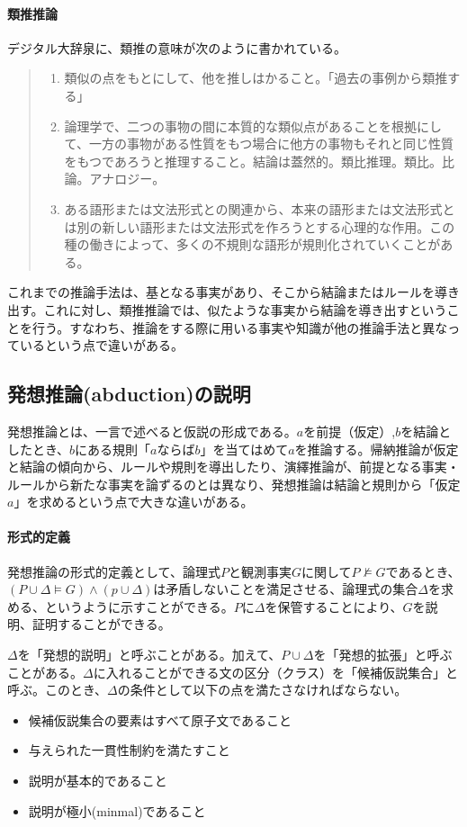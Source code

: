 \documentclass[dvipdfmx]{jsarticle}
\begin{document}
\paragraph{類推推論}デジタル大辞泉に、類推の意味が次のように書かれている。
\begin{quote}
  \begin{enumerate}
    \item 類似の点をもとにして、他を推しはかること。「過去の事例から類推する」
    \item 論理学で、二つの事物の間に本質的な類似点があることを根拠にして、一方の事物がある性質をもつ場合に他方の事物もそれと同じ性質をもつであろうと推理すること。結論は蓋然的。類比推理。類比。比論。アナロジー。
    \item ある語形または文法形式との関連から、本来の語形または文法形式とは別の新しい語形または文法形式を作ろうとする心理的な作用。この種の働きによって、多くの不規則な語形が規則化されていくことがある。
  \end{enumerate}
\end{quote}
これまでの推論手法は、基となる事実があり、そこから結論またはルールを導き出す。これに対し、類推推論では、似たような事実から結論を導き出すということを行う。すなわち、推論をする際に用いる事実や知識が他の推論手法と異なっているという点で違いがある。

\subsection{発想推論(abduction)の説明}
発想推論とは、一言で述べると仮説の形成である。$a$を前提（仮定）,$b$を結論としたとき、$b$にある規則「$aならばb$」を当てはめて$a$を推論する。帰納推論が仮定と結論の傾向から、ルールや規則を導出したり、演繹推論が、前提となる事実・ルールから新たな事実を論ずるのとは異なり、発想推論は結論と規則から「仮定$a$」を求めるという点で大きな違いがある。\par
\paragraph{形式的定義}
発想推論の形式的定義として、論理式$P$と観測事実$G$に関して$P \nvDash G$であるとき、$(P \cup \Delta \models G) \wedge (p \cup \Delta)$は矛盾しないことを満足させる、論理式の集合$\Delta$を求める、というように示すことができる。$P$に$\Delta$を保管することにより、$G$を説明、証明することができる。\par
$\Delta$を「発想的説明」と呼ぶことがある。加えて、$P \cup \Delta$を「発想的拡張」と呼ぶことがある。$\Delta$に入れることができる文の区分（クラス）を「候補仮説集合」と呼ぶ。このとき、$\Delta$の条件として以下の点を満たさなければならない。
\begin{itemize}
  \item 候補仮説集合の要素はすべて原子文であること
  \item 与えられた一貫性制約を満たすこと
  \item 説明が基本的であること
  \item 説明が極小(minmal)であること
\end{itemize}
\end{document}
